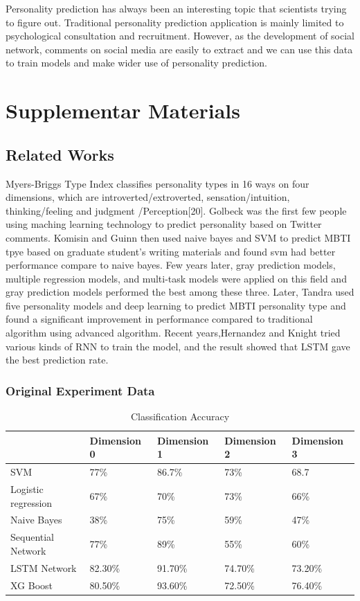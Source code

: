 \documentclass{article}
\begin{document}
 Personality prediction has always been an interesting topic that scientists trying to figure out. Traditional personality prediction application is mainly limited to psychological consultation and recruitment. However, as the development of social network, comments on social media are easily to extract and we can use this data to train models and make wider use of personality prediction.
 
 
\section{Supplementar Materials}

\subsection{Related Works}
 Myers-Briggs Type Index classifies personality types in 16 ways on four dimensions, which are introverted/extroverted,  sensation/intuition, thinking/feeling and judgment /Perception[20]. Golbeck was the first few people using maching learning technology to predict personality based on Twitter comments. Komisin and Guinn then used naive bayes and SVM to predict MBTI tpye based on graduate student's writing materials and found svm had better performance compare to naive bayes. Few years later, gray prediction models, multiple regression models, and multi-task models were applied on this field and gray prediction models performed the best among these three. Later, Tandra used five personality models and deep learning to predict MBTI personality type and found a significant improvement in performance compared to traditional algorithm using advanced algorithm. Recent years,Hernandez and Knight tried various kinds of RNN to train the model, and the result showed that LSTM gave the best prediction rate.
 
\subsubsection{Original Experiment Data}
\begin{table}[h]
	\vspace{20pt}
	\centering
	\begin{tabular}{lllll}
		\hline  
		  & Dimension 0 & Dimension 1 & Dimension 2 & Dimension 3\\
		  \hline  
		  SVM & 77\% & 86.7\% & 73\% & 68.7 \\ 
		Logistic regression & 67\% & 70\% & 73\% & 66\% \\
		Naive Bayes	& 38\%	& 75\% & 59\% &47\% \\
		Sequential Network & 77\% &	89\% & 55\% & 60\% \\
		LSTM Network & 82.30\% & 91.70\% & 74.70\% & 73.20\% \\
		XG Boost & 80.50\% & 93.60\% & 72.50\%	& 76.40\% \\
		\hline       
	\end{tabular}
	\caption{Classification Accuracy}
\label{bs}
\end{table}
\end{document}
